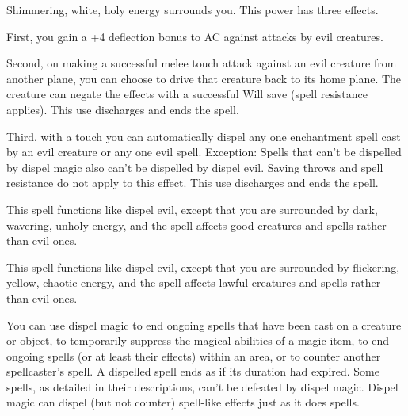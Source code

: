 \begin{multicols}{2}
\begin{small}
\noindent Shimmering, white, holy energy surrounds you. This power has three effects.

\smallskip\noindent First, you gain a +4 deflection bonus to AC against attacks by evil creatures.

\smallskip\noindent Second, on making a successful melee touch attack against an evil creature from another plane, you can choose to drive that creature back to its home plane. The creature can negate the effects with a successful Will save (spell resistance applies). This use discharges and ends the spell.

\smallskip\noindent Third, with a touch you can automatically dispel any one enchantment spell cast by an evil creature or any one evil spell. Exception: Spells that can't be dispelled by dispel magic also can't be dispelled by dispel evil. Saving throws and spell resistance do not apply to this effect. This use discharges and ends the spell.

\noindent This spell functions like dispel evil, except that you are surrounded by dark, wavering, unholy energy, and the spell affects good creatures and spells rather than evil ones.

\noindent This spell functions like dispel evil, except that you are surrounded by flickering, yellow, chaotic energy, and the spell affects lawful creatures and spells rather than evil ones.

\noindent You can use dispel magic to end ongoing spells that have been cast on a creature or object, to temporarily suppress the magical abilities of a magic item, to end ongoing spells (or at least their effects) within an area, or to counter another spellcaster's spell. A dispelled spell ends as if its duration had expired. Some spells, as detailed in their descriptions, can't be defeated by dispel magic. Dispel magic can dispel (but not counter) spell-like effects just as it does spells.


\end{small}
\end{multicols}
